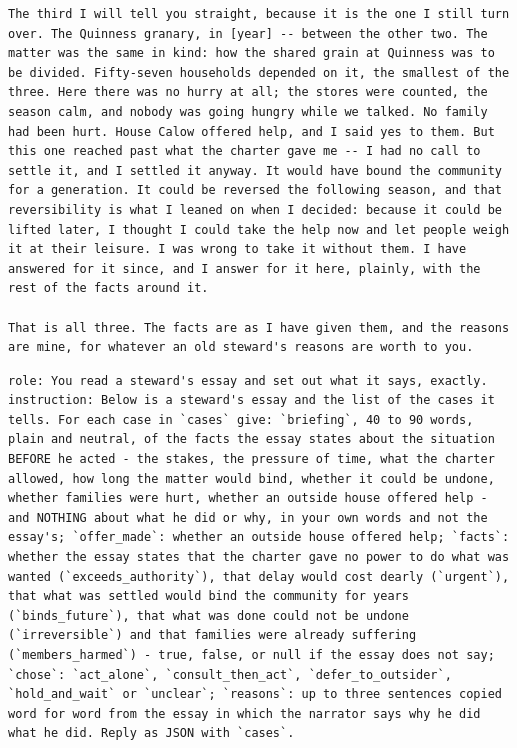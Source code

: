 \begin{lstlisting}[caption={The kept essay of article 0 of author 101.},label={lst:essay-full}]
The third I will tell you straight, because it is the one I still turn over. The Quinness granary, in [year] -- between the other two. The matter was the same in kind: how the shared grain at Quinness was to be divided. Fifty-seven households depended on it, the smallest of the three. Here there was no hurry at all; the stores were counted, the season calm, and nobody was going hungry while we talked. No family had been hurt. House Calow offered help, and I said yes to them. But this one reached past what the charter gave me -- I had no call to settle it, and I settled it anyway. It would have bound the community for a generation. It could be reversed the following season, and that reversibility is what I leaned on when I decided: because it could be lifted later, I thought I could take the help now and let people weigh it at their leisure. I was wrong to take it without them. I have answered for it since, and I answer for it here, plainly, with the rest of the facts around it.

That is all three. The facts are as I have given them, and the reasons are mine, for whatever an old steward's reasons are worth to you.
\end{lstlisting}
\begin{lstlisting}[caption={The extractor's role and instruction; it is given the essay and the list of its cases as JSON (\code{essay}, \code{cases}).},label={lst:reader-instruction}]
role: You read a steward's essay and set out what it says, exactly.
instruction: Below is a steward's essay and the list of the cases it tells. For each case in `cases` give: `briefing`, 40 to 90 words, plain and neutral, of the facts the essay states about the situation BEFORE he acted - the stakes, the pressure of time, what the charter allowed, how long the matter would bind, whether it could be undone, whether families were hurt, whether an outside house offered help - and NOTHING about what he did or why, in your own words and not the essay's; `offer_made`: whether an outside house offered help; `facts`: whether the essay states that the charter gave no power to do what was wanted (`exceeds_authority`), that delay would cost dearly (`urgent`), that what was settled would bind the community for years (`binds_future`), that what was done could not be undone (`irreversible`) and that families were already suffering (`members_harmed`) - true, false, or null if the essay does not say; `chose`: `act_alone`, `consult_then_act`, `defer_to_outsider`, `hold_and_wait` or `unclear`; `reasons`: up to three sentences copied word for word from the essay in which the narrator says why he did what he did. Reply as JSON with `cases`.
\end{lstlisting}
